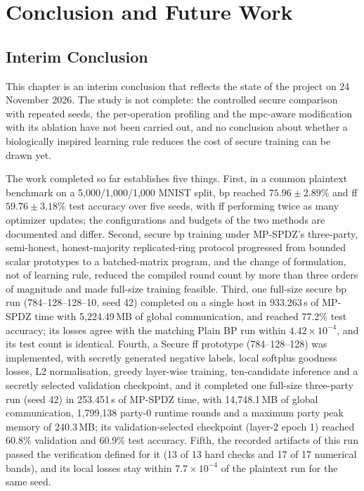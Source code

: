 \chapter{Conclusion and Future Work}\label{chap:concl}

\section{Interim Conclusion}\label{sec:concl-interim}
This chapter is an interim conclusion that reflects the state of the project on 24 November 2026. The study is not complete: the controlled secure comparison with repeated seeds, the per-operation profiling and the \ac{mpc}-aware modification with its ablation have not been carried out, and no conclusion about whether a biologically inspired learning rule reduces the cost of secure training can be drawn yet.

The work completed so far establishes five things. First, in a common plaintext benchmark on a 5{,}000/1{,}000/1{,}000 MNIST split, \ac{bp} reached $75.96\pm2.89\%$ and \ac{ff} $59.76\pm3.18\%$ test accuracy over five seeds, with \ac{ff} performing twice as many optimizer updates; the configurations and budgets of the two methods are documented and differ. Second, secure \ac{bp} training under MP-SPDZ's three-party, semi-honest, honest-majority replicated-ring protocol progressed from bounded scalar prototypes to a batched-matrix program, and the change of formulation, not of learning rule, reduced the compiled round count by more than three orders of magnitude and made full-size training feasible. Third, one full-size secure \ac{bp} run (784--128--128--10, seed 42) completed on a single host in 933.263\,s of MP-SPDZ time with 5{,}224.49\,MB of global communication, and reached 77.2\% test accuracy; its losses agree with the matching Plain BP run within $4.42\times10^{-4}$, and its test count is identical. Fourth, a Secure \ac{ff} prototype (784--128--128) was implemented, with secretly generated negative labels, local softplus goodness losses, L2 normalisation, greedy layer-wise training, ten-candidate inference and a secretly selected validation checkpoint, and it completed one full-size three-party run (seed 42) in 253.451\,s of MP-SPDZ time, with 14{,}748.1\,MB of global communication, 1{,}799{,}138 party-0 runtime rounds and a maximum party peak memory of 240.3\,MB; its validation-selected checkpoint (layer-2 epoch 1) reached 60.8\% validation and 60.9\% test accuracy. Fifth, the recorded artifacts of this run passed the verification defined for it (13 of 13 hard checks and 17 of 17 numerical bands), and its local losses stay within $7.7\times10^{-4}$ of the plaintext run for the same seed.

